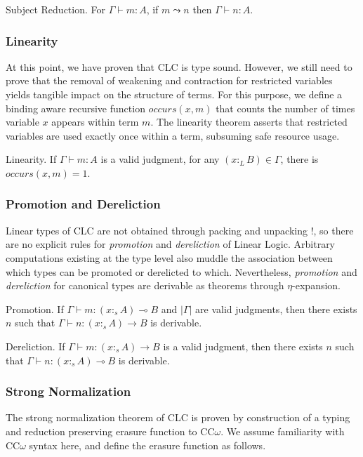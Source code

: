 \documentclass[sigplan,screen,review,authordraft]{acmart}
\newcommand{\pure}[1]{|#1|}
\newcommand{\ltype}{:_{\scriptscriptstyle L}}
\newcommand{\stype}[1]{:_#1}
\newcommand{\pstep}{\leadsto}
\begin{document}
\begin{theorem}
  Subject Reduction. For $\Gamma \vdash m : A$, if $m \pstep n$ then $\Gamma \vdash n : A$.
\end{theorem}

\subsubsection{Linearity}
At this point, we have proven that CLC is type sound. However, we still need to prove that the removal of weakening and contraction for restricted variables yields tangible impact on the structure of terms. For this purpose, we define a binding aware recursive function $occurs(x, m)$ that counts the number of times variable $x$ appears within term $m$. The linearity theorem asserts that restricted variables are used exactly once within a term, subsuming safe resource usage.

\begin{theorem}
  Linearity. If $\Gamma \vdash m : A$ is a valid judgment, for any $(x \ltype B) \in \Gamma$, there is $occurs(x, m) = 1$.
\end{theorem}

\subsubsection{Promotion and Dereliction}
Linear types of CLC are not obtained through packing and unpacking !, so there are no explicit rules for \textit{promotion} and \textit{dereliction} of Linear Logic. Arbitrary computations existing at the type level also muddle the association between which types can be promoted or derelicted to which. Nevertheless, \textit{promotion} and \textit{dereliction} for canonical types are derivable as theorems through $\eta$-expansion.

\begin{theorem}
  Promotion. If $\Gamma \vdash m : (x \stype{s} A) \multimap B$ and $\pure{\Gamma}$ are valid judgments, then there exists $n$ such that $\Gamma \vdash n : (x \stype{s} A) \rightarrow B$ is derivable.
\end{theorem}

\begin{theorem}
  Dereliction. If $\Gamma \vdash m : (x \stype{s} A) \rightarrow B$ is a valid judgment, then there exists $n$ such that $\Gamma \vdash n : (x \stype{s} A) \multimap B$ is derivable.
\end{theorem}

\subsubsection{Strong Normalization}
The strong normalization theorem of CLC is proven by construction of a typing and reduction preserving erasure function to CC$\omega$. We assume familiarity with CC$\omega$ syntax here, and define the erasure function as follows.
\end{document}
